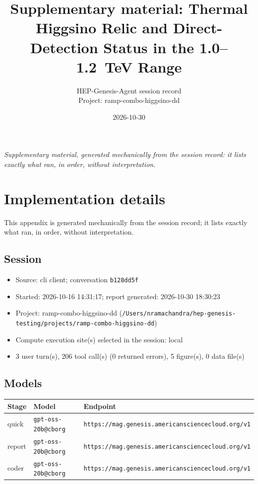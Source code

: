\documentclass[11pt,a4paper]{article}
\title{Supplementary material: Thermal Higgsino Relic and Direct-Detection Status in the 1.0--1.2~TeV Range}
\author{HEP-Genesis-Agent session record \\ \small Project: ramp-combo-higgsino-dd}
\date{2026-10-30}
\begin{document}
\maketitle
\noindent\textit{\small Supplementary material, generated mechanically from the session record: it lists exactly what ran, in order, without interpretation.}
\vspace{1em}



\appendix
\section{Implementation details}
\label{app:impl}
This appendix is generated mechanically from the session record; it lists exactly what ran, in order, without interpretation.
\subsection{Session}
\begin{itemize}
  \item Source: cli client; conversation \texttt{b128dd5f}
  \item Started: 2026-10-16 14:31:17; report generated: 2026-10-30 18:30:23
  \item Project: ramp-combo-higgsino-dd (\texttt{/\allowbreak{}Users/\allowbreak{}nramachandra/\allowbreak{}hep-genesis-testing/\allowbreak{}projects/\allowbreak{}ramp-combo-higgsino-dd})
  \item Compute execution site(s) selected in the session: local
  \item 3 user turn(s), 206 tool call(s) (0 returned errors), 5 figure(s), 0 data file(s)
\end{itemize}
\subsection{Models}
\begin{longtable}{@{}p{}p{}p{}@{}}
\toprule Stage & Model & Endpoint \\ \midrule \endhead
quick & \texttt{gpt-oss-20b@cborg} & \texttt{https:\allowbreak{}/\allowbreak{}/\allowbreak{}mag.genesis.americansciencecloud.org/\allowbreak{}v1} \\
report & \texttt{gpt-oss-20b@cborg} & \texttt{https:\allowbreak{}/\allowbreak{}/\allowbreak{}mag.genesis.americansciencecloud.org/\allowbreak{}v1} \\
coder & \texttt{gpt-oss-20b@cborg} & \texttt{https:\allowbreak{}/\allowbreak{}/\allowbreak{}mag.genesis.americansciencecloud.org/\allowbreak{}v1} \\
\bottomrule\end{longtable}
\end{document}
